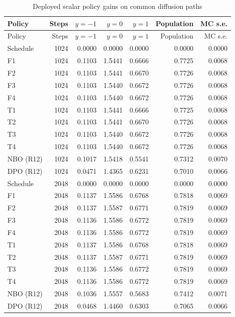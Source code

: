 \begingroup\small
\begin{longtable}{lrrrrrr}
\caption{Deployed scalar policy gains on common diffusion paths}\label{tab:r15scalarallmeshes}\\
\toprule
Policy & Steps & $y=-1$ & $y=0$ & $y=1$ & Population & MC s.e. \\
\midrule
\endfirsthead
\toprule
Policy & Steps & $y=-1$ & $y=0$ & $y=1$ & Population & MC s.e. \\
\midrule
\endhead
Schedule & 1024 & 0.0000 & 0.0000 & 0.0000 & 0.0000 & 0.0000 \\
F1 & 1024 & 0.1103 & 1.5441 & 0.6666 & 0.7725 & 0.0068 \\
F2 & 1024 & 0.1103 & 1.5441 & 0.6670 & 0.7726 & 0.0068 \\
F3 & 1024 & 0.1103 & 1.5440 & 0.6672 & 0.7726 & 0.0068 \\
F4 & 1024 & 0.1103 & 1.5440 & 0.6672 & 0.7726 & 0.0068 \\
T1 & 1024 & 0.1103 & 1.5441 & 0.6666 & 0.7725 & 0.0068 \\
T2 & 1024 & 0.1103 & 1.5441 & 0.6670 & 0.7726 & 0.0068 \\
T3 & 1024 & 0.1103 & 1.5440 & 0.6672 & 0.7726 & 0.0068 \\
T4 & 1024 & 0.1103 & 1.5440 & 0.6672 & 0.7726 & 0.0068 \\
NBO (R12) & 1024 & 0.1017 & 1.5418 & 0.5541 & 0.7312 & 0.0070 \\
DPO (R12) & 1024 & 0.0471 & 1.4365 & 0.6231 & 0.7010 & 0.0066 \\
Schedule & 2048 & 0.0000 & 0.0000 & 0.0000 & 0.0000 & 0.0000 \\
F1 & 2048 & 0.1137 & 1.5586 & 0.6768 & 0.7818 & 0.0069 \\
F2 & 2048 & 0.1137 & 1.5587 & 0.6771 & 0.7819 & 0.0069 \\
F3 & 2048 & 0.1136 & 1.5586 & 0.6772 & 0.7819 & 0.0069 \\
F4 & 2048 & 0.1136 & 1.5586 & 0.6772 & 0.7819 & 0.0069 \\
T1 & 2048 & 0.1137 & 1.5586 & 0.6768 & 0.7818 & 0.0069 \\
T2 & 2048 & 0.1137 & 1.5587 & 0.6771 & 0.7819 & 0.0069 \\
T3 & 2048 & 0.1136 & 1.5586 & 0.6772 & 0.7819 & 0.0069 \\
T4 & 2048 & 0.1136 & 1.5586 & 0.6772 & 0.7819 & 0.0069 \\
NBO (R12) & 2048 & 0.1036 & 1.5557 & 0.5683 & 0.7412 & 0.0071 \\
DPO (R12) & 2048 & 0.0468 & 1.4460 & 0.6303 & 0.7065 & 0.0066 \\
\bottomrule
\end{longtable}
